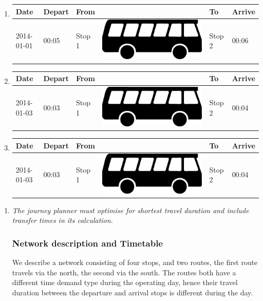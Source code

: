 \documentclass[a4paper,11pt]{article}
\newcommand*{\bus}{\includegraphics[scale=0.02]{img/bus}}
\begin{document}
\begin{enumerate}
\begin{enumerate}
\item
{\scriptsize
\begin{tabular}{p{1.4cm} | p{.75cm} | p{2.1cm} c p{2.1cm} | p{.75cm} }
\hline
\rowcolor{Gray}
Date & Depart & From & & To & Arrive \\
\hline
2014-01-01 & 00:05 & Stop 1 & \bus & Stop 2 & 00:06 \\
\hline
\end{tabular}
}

\item
{\scriptsize
\begin{tabular}{p{1.4cm} | p{.75cm} | p{2.1cm} c p{2.1cm} | p{.75cm} }
\hline
\rowcolor{Gray}
Date & Depart & From & & To & Arrive \\
\hline
2014-01-03 & 00:03 & Stop 1 & \bus & Stop 2 & 00:04 \\
\hline
\end{tabular}
}

\item
{\scriptsize
\begin{tabular}{p{1.4cm} | p{.75cm} | p{2.1cm} c p{2.1cm} | p{.75cm} }
\hline
\rowcolor{Gray}
Date & Depart & From & & To & Arrive \\
\hline
2014-01-03 & 00:03 & Stop 1 & \bus & Stop 2 & 00:04 \\
\hline
\end{tabular}
}

\end{enumerate}
\newpage

\begin{enumerate}
\item \textit{The journey planner must optimise for shortest travel duration and include transfer times in its calculation.}
\subsubsection*{Network description and Timetable}
We describe a network consisting of four stops, and two routes, the first route travels via the north, the second via the south.
The routes both have a different time demand type during the operating day, hence their travel duration between the departure and arrival stops is different during the day.




\end{enumerate}
\end{enumerate}
\end{document}
